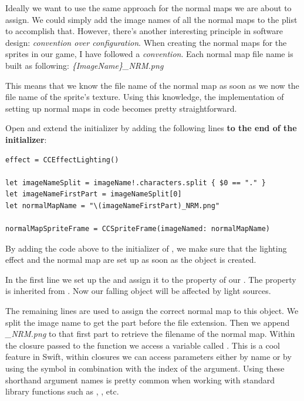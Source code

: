 Ideally we want to use the same approach for the normal maps we are about to
assign. We could simply add the image names of all the normal maps to the plist
to accomplish that. However, there's another interesting principle in software
design: \textit{convention over configuration}. When creating the normal maps
for the sprites in our game, I have followed a \textit{convention}. Each normal
map file name is built as following: \textit{\{ImageName\}\_NRM.png}

This means that we know the file name of the normal map as soon as we now the
file name of the sprite's texture. Using this knowledge, the implementation of
setting up normal maps in code becomes pretty straightforward.

\begin{leftbar}
Open  and extend the 
initializer by adding the following lines \textbf{to the end of the
initializer}:
\begin{lstlisting}
effect = CCEffectLighting()
    
let imageNameSplit = imageName!.characters.split { $0 == "." }
let imageNameFirstPart = imageNameSplit[0]
let normalMapName = "\(imageNameFirstPart)_NRM.png"

normalMapSpriteFrame = CCSpriteFrame(imageNamed: normalMapName)
\end{lstlisting}
\end{leftbar}

By adding the code above to the initializer of , we
make sure that the lighting effect and the normal map are set up as soon as the
object is created.

In the first line we set up the  and assign it to
the  property of our . The
 property is inherited from . Now our
falling object will be affected by light sources.

The remaining lines are used to assign the correct normal map to this object. We
split the image name to get the part before the file extension. Then we append
\textit{\_NRM.png} to that first part to retrieve the filename of the normal
map. Within the closure passed to the  function we access a
variable called . This is a cool feature in Swift, within
closures we can access parameters either by name or by using the \inlinecode{\$}
symbol in combination with the index of the argument. Using these shorthand
argument names is pretty common when working with standard library functions
such as , , etc.


